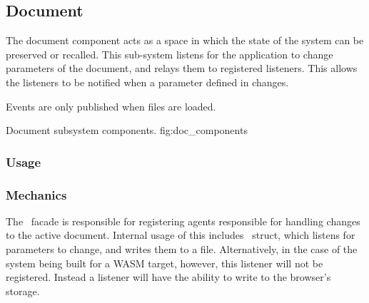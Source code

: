 \newcommand{\docarea}[3]{
    \index{#1}\pbodyitem{#2}{#3}
}

\newcommand{\extparamref}[3]{
    \index{#1}\pbodyitem{#2}{#3}
}

\subsection{Document}
The document component acts as a space in which the state of the system can be preserved or recalled.
This sub-system listens for the application to change parameters of the document, and relays them to registered listeners.
This allows the listeners to be notified when a parameter defined in  changes.

Events are only published when files are loaded.

{Document subsystem components.}
{fig:doc_components}

\subsubsection{Usage}


\subsubsection{Mechanics}
The \dmod\ facade is responsible for registering agents responsible for handling changes to the active document.
Internal usage of this includes \dffspcstype\ struct, which listens for parameters to change, and writes them to a file.
Alternatively, in the case of the system being built for a WASM target, however, this listener will not be registered.
Instead a \dflspcstype{} listener will have the ability to write to the browser's storage.